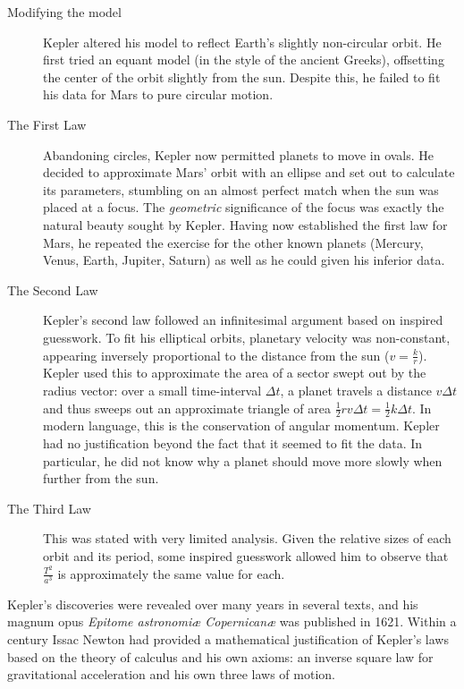 \begin{description}
  \item[Modifying the model] Kepler altered his model to reflect Earth's slightly non-circular orbit. He first tried an equant model (in the style of the ancient Greeks), offsetting the center of the orbit slightly from the sun. Despite this, he failed to fit his data for Mars to pure circular motion.
  
  \item[The First Law] Abandoning circles, Kepler now permitted planets to move in ovals. He decided to approximate Mars' orbit with an ellipse and set out to calculate its parameters, stumbling on an almost perfect match when the sun was placed at a focus. The \emph{geometric} significance of the focus was exactly the natural beauty sought by Kepler. Having now established the first law for Mars, he repeated the exercise for the other known planets (Mercury, Venus, Earth, Jupiter, Saturn) as well as he could given his inferior data.
  
  \item[The Second Law]\label{pg:kepler2} Kepler's second law followed an infinitesimal argument based on inspired guesswork. To fit his elliptical orbits, planetary velocity was non-constant, appearing inversely proportional to the distance from the sun ($v=\frac kr$). Kepler used this to approximate the area of a sector swept out by the radius vector: over a small time-interval $\Delta t$, a planet travels a distance $v\Delta t$ and thus sweeps out an approximate triangle of area $\frac 12rv\Delta t=\frac 12k\Delta t$. In modern language, this is the conservation of angular momentum. Kepler had no justification beyond the fact that it seemed to fit the data. In particular, he did not know why a planet should move more slowly when further from the sun.
  
  \item[The Third Law] This was stated with very limited analysis. Given the relative sizes of each orbit and its period, some inspired guesswork allowed him to observe that $\frac{T^2}{a^3}$ is approximately the same value for each.
\end{description}


Kepler's discoveries were revealed over many years in several texts, and his magnum opus \emph{Epitome astronomiæ Copernicanæ} was published in 1621. Within a century Issac Newton had provided a mathematical justification of Kepler's laws based on the theory of calculus and his own axioms: an inverse square law for gravitational acceleration and his own three laws of motion.

